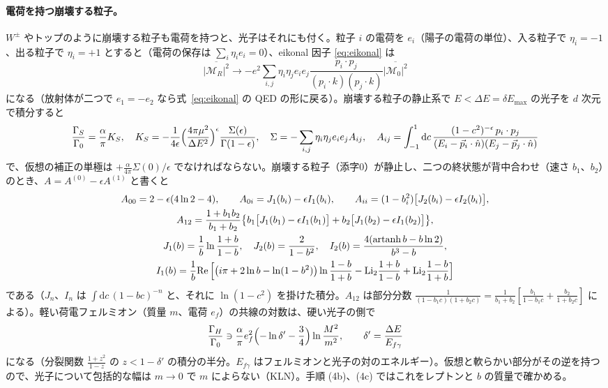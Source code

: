 \documentclass[a4paper,10pt]{ltjsarticle}
\newcommand{\dd}{\mathrm{d}}
\newcommand{\re}{\mathrm{Re}\,}
\begin{document}
\paragraph{電荷を持つ崩壊する粒子。}$W^\pm$ やトップのように崩壊する粒子も電荷を持つと、光子はそれにも付く。粒子 $i$ の電荷を $e_i$（陽子の電荷の単位）、入る粒子で $\eta_i=-1$、出る粒子で $\eta_i=+1$ とすると（電荷の保存は $\sum_i\eta_ie_i=0$）、eikonal 因子 \eqref{eq:eikonal} は
\begin{equation}
\overline{|\mathcal M_R|^2}\to-e^2\sum_{i,j}\eta_i\eta_je_ie_j\frac{p_i\cdot p_j}{(p_i\cdot k)(p_j\cdot k)}\overline{|\mathcal M_0|^2}
\label{eq:eikonalQ}
\end{equation}
になる（放射体が二つで $e_1=-e_2$ なら式~\eqref{eq:eikonal} の QED の形に戻る）。崩壊する粒子の静止系で $E<\Delta E=\delta E_{\max}$ の光子を $d$ 次元で積分すると
\begin{equation}
\frac{\Gamma_S}{\Gamma_0}=\frac\alpha\pi K_S,\quad K_S=-\frac1{4\epsilon}\Bigl(\frac{4\pi\mu^2}{\Delta E^2}\Bigr)^\epsilon\frac{\Sigma(\epsilon)}{\Gamma(1-\epsilon)},\quad
\Sigma=-\sum_{i,j}\eta_i\eta_je_ie_jA_{ij},\quad A_{ij}=\int_{-1}^1\dd c\,\frac{(1-c^2)^{-\epsilon}\,p_i\cdot p_j}{(E_i-\vec p_i\cdot\hat n)(E_j-\vec p_j\cdot\hat n)}
\label{eq:softQ}
\end{equation}
で、仮想の補正の単極は $+\frac\alpha{4\pi}\Sigma(0)/\epsilon$ でなければならない。崩壊する粒子（添字0）が静止し、二つの終状態が背中合わせ（速さ $b_1$、$b_2$）のとき、$A=A^{(0)}-\epsilon A^{(1)}$ と書くと
\begin{equation}
\begin{gathered}
A_{00}=2-\epsilon(4\ln2-4),\qquad A_{0i}=J_1(b_i)-\epsilon I_1(b_i),\qquad A_{ii}=(1-b_i^2)\bigl[J_2(b_i)-\epsilon I_2(b_i)\bigr],\\
A_{12}=\frac{1+b_1b_2}{b_1+b_2}\bigl\{b_1\bigl[J_1(b_1)-\epsilon I_1(b_1)\bigr]+b_2\bigl[J_1(b_2)-\epsilon I_1(b_2)\bigr]\bigr\},\\
J_1(b)=\frac1b\ln\frac{1+b}{1-b},\quad J_2(b)=\frac2{1-b^2},\quad I_2(b)=\frac{4(\operatorname{artanh}b-b\ln2)}{b^3-b},\\
I_1(b)=\frac1b\re\Bigl[\bigl(i\pi+2\ln b-\ln(1-b^2)\bigr)\ln\frac{1-b}{1+b}-\mathrm{Li}_2\frac{1+b}{1-b}+\mathrm{Li}_2\frac{1-b}{1+b}\Bigr]
\end{gathered}
\label{eq:Aij}
\end{equation}
である（$J_n$、$I_n$ は $\int\dd c\,(1-bc)^{-n}$ と、それに $\ln(1-c^2)$ を掛けた積分。$A_{12}$ は部分分数 $\frac1{(1-b_1c)(1+b_2c)}=\frac1{b_1+b_2}[\frac{b_1}{1-b_1c}+\frac{b_2}{1+b_2c}]$ による）。軽い荷電フェルミオン（質量 $m$、電荷 $e_f$）の共線の対数は、硬い光子の側で
\begin{equation}
\frac{\Gamma_H}{\Gamma_0}\ni\frac\alpha\pi e_f^2\Bigl(-\ln\delta'-\frac34\Bigr)\ln\frac{M^2}{m^2},\qquad\delta'=\frac{\Delta E}{E_{f\gamma}}
\label{eq:collin}
\end{equation}
になる（分裂関数 $\frac{1+z^2}{1-z}$ の $z<1-\delta'$ の積分の半分。$E_{f\gamma}$ はフェルミオンと光子の対のエネルギー）。仮想と軟らかい部分がその逆を持つので、光子について包括的な幅は $m\to0$ で $m$ によらない（KLN）。手順 (4b)、(4c) ではこれをレプトンと $b$ の質量で確かめる。
\end{document}
